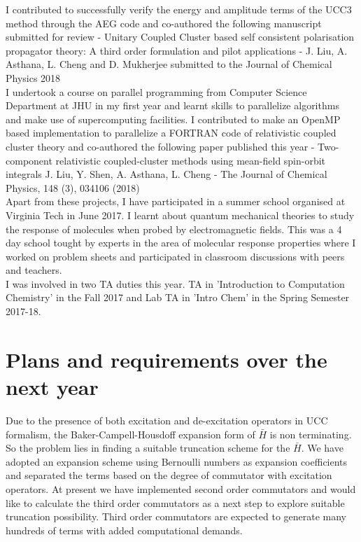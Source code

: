 \documentclass[11pt]{article}   	%
\begin{document}
I contributed to successfully verify the energy and amplitude terms of the UCC3 method through the AEG code and co-authored the following manuscript submitted for review - Unitary Coupled Cluster based self consistent polarisation propagator theory: A third order formulation and pilot applications - J. Liu, A. Asthana, L. Cheng and D. Mukherjee submitted to the Journal of Chemical Physics 2018\\

I undertook a course on parallel programming from Computer Science Department at JHU in my first year and learnt skills to parallelize algorithms and make use of supercomputing facilities. I contributed to make an OpenMP based implementation to parallelize a FORTRAN code of relativistic coupled cluster theory and co-authored the following paper published this year - Two-component relativistic coupled-cluster methods using mean-field spin-orbit integrals
J. Liu, Y. Shen, A. Asthana, L. Cheng - The Journal of Chemical Physics, 148 (3), 034106 (2018)\\

Apart from these projects, I have participated in a summer school organised at Virginia Tech in June 2017. I learnt about quantum mechanical theories to study the response of molecules when probed by electromagnetic fields. This was a 4 day school tought by experts in the area of molecular response properties where I worked on problem sheets and participated in classroom discussions with peers and teachers.\\

I was involved in two TA duties this year. TA in 'Introduction to Computation Chemistry' in the Fall 2017 and Lab TA in 'Intro Chem' in the Spring Semester 2017-18.\\
\section{Plans and requirements over the next year}
Due to the presence of both excitation and de-excitation operators in UCC formalism, the Baker-Campell-Housdoff expansion form of $\bar{H}$ is non terminating. So the problem lies in finding a suitable truncation scheme for the $\bar{H}$. We have adopted an expansion scheme using Bernoulli numbers as expansion coefficients and separated the terms based on the degree of commutator with excitation operators. At present we have implemented second order commutators and would like to calculate the third order commutators as a next step to explore suitable truncation possibility. Third order commutators are expected to generate many hundreds of terms with added computational demands. 
\end{document}
